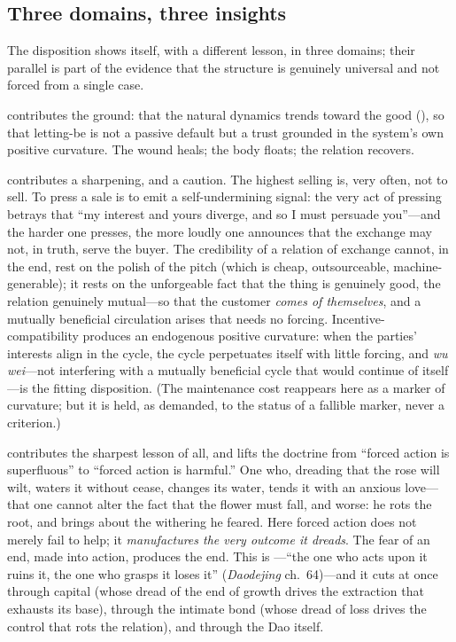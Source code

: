 \subsection{Three domains, three insights}
\label{p09:sec:three-domains}

The disposition shows itself, with a different lesson, in three domains; their parallel is part of the evidence that the structure is genuinely universal and not forced from a single case.

 contributes the ground: that the natural dynamics trends toward the good (), so that letting-be is not a passive default but a trust grounded in the system's own positive curvature. The wound heals; the body floats; the relation recovers.

 contributes a sharpening, and a caution. The highest selling is, very often, not to sell. To press a sale is to emit a self-undermining signal: the very act of pressing betrays that ``my interest and yours diverge, and so I must persuade you''---and the harder one presses, the more loudly one announces that the exchange may not, in truth, serve the buyer. The credibility of a relation of exchange cannot, in the end, rest on the polish of the pitch (which is cheap, outsourceable, machine-generable); it rests on the unforgeable fact that the thing is genuinely good, the relation genuinely mutual---so that the customer \emph{comes of themselves}, and a mutually beneficial circulation arises that needs no forcing. Incentive-compatibility produces an endogenous positive curvature: when the parties' interests align in the cycle, the cycle perpetuates itself with little forcing, and \emph{wu wei}---not interfering with a mutually beneficial cycle that would continue of itself---is the fitting disposition. (The maintenance cost reappears here as a marker of curvature; but it is held, as  demanded, to the status of a fallible marker, never a criterion.)

 contributes the sharpest lesson of all, and lifts the doctrine from ``forced action is superfluous'' to ``forced action is harmful.'' One who, dreading that the rose will wilt, waters it without cease, changes its water, tends it with an anxious love---that one cannot alter the fact that the flower must fall, and worse: he rots the root, and brings about the withering he feared. Here forced action does not merely fail to help; it \emph{manufactures the very outcome it dreads}. The fear of an end, made into action, produces the end. This is ---``the one who acts upon it ruins it, the one who grasps it loses it'' (\emph{Daodejing} ch.~64)---and it cuts at once through capital (whose dread of the end of growth drives the extraction that exhausts its base), through the intimate bond (whose dread of loss drives the control that rots the relation), and through the Dao itself. 

